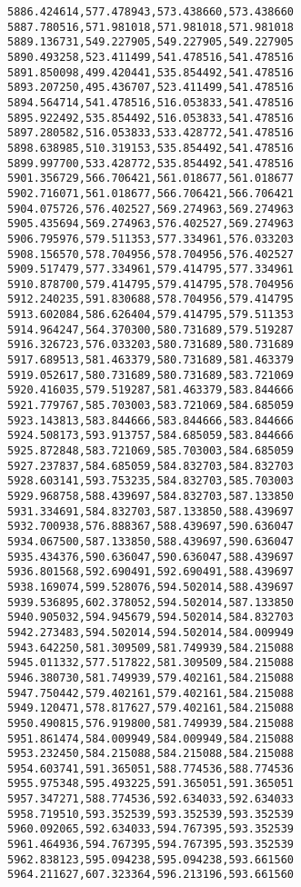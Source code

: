 \documentclass[11pt]{article}
\begin{document}
\begin{Verbatim}[commandchars=\\\{\}]
5886.424614,577.478943,573.438660,573.438660
5887.780516,571.981018,571.981018,571.981018
5889.136731,549.227905,549.227905,549.227905
5890.493258,523.411499,541.478516,541.478516
5891.850098,499.420441,535.854492,541.478516
5893.207250,495.436707,523.411499,541.478516
5894.564714,541.478516,516.053833,541.478516
5895.922492,535.854492,516.053833,541.478516
5897.280582,516.053833,533.428772,541.478516
5898.638985,510.319153,535.854492,541.478516
5899.997700,533.428772,535.854492,541.478516
5901.356729,566.706421,561.018677,561.018677
5902.716071,561.018677,566.706421,566.706421
5904.075726,576.402527,569.274963,569.274963
5905.435694,569.274963,576.402527,569.274963
5906.795976,579.511353,577.334961,576.033203
5908.156570,578.704956,578.704956,576.402527
5909.517479,577.334961,579.414795,577.334961
5910.878700,579.414795,579.414795,578.704956
5912.240235,591.830688,578.704956,579.414795
5913.602084,586.626404,579.414795,579.511353
5914.964247,564.370300,580.731689,579.519287
5916.326723,576.033203,580.731689,580.731689
5917.689513,581.463379,580.731689,581.463379
5919.052617,580.731689,580.731689,583.721069
5920.416035,579.519287,581.463379,583.844666
5921.779767,585.703003,583.721069,584.685059
5923.143813,583.844666,583.844666,583.844666
5924.508173,593.913757,584.685059,583.844666
5925.872848,583.721069,585.703003,584.685059
5927.237837,584.685059,584.832703,584.832703
5928.603141,593.753235,584.832703,585.703003
5929.968758,588.439697,584.832703,587.133850
5931.334691,584.832703,587.133850,588.439697
5932.700938,576.888367,588.439697,590.636047
5934.067500,587.133850,588.439697,590.636047
5935.434376,590.636047,590.636047,588.439697
5936.801568,592.690491,592.690491,588.439697
5938.169074,599.528076,594.502014,588.439697
5939.536895,602.378052,594.502014,587.133850
5940.905032,594.945679,594.502014,584.832703
5942.273483,594.502014,594.502014,584.009949
5943.642250,581.309509,581.749939,584.215088
5945.011332,577.517822,581.309509,584.215088
5946.380730,581.749939,579.402161,584.215088
5947.750442,579.402161,579.402161,584.215088
5949.120471,578.817627,579.402161,584.215088
5950.490815,576.919800,581.749939,584.215088
5951.861474,584.009949,584.009949,584.215088
5953.232450,584.215088,584.215088,584.215088
5954.603741,591.365051,588.774536,588.774536
5955.975348,595.493225,591.365051,591.365051
5957.347271,588.774536,592.634033,592.634033
5958.719510,593.352539,593.352539,593.352539
5960.092065,592.634033,594.767395,593.352539
5961.464936,594.767395,594.767395,593.352539
5962.838123,595.094238,595.094238,593.661560
5964.211627,607.323364,596.213196,593.661560

\end{Verbatim}
\end{document}
